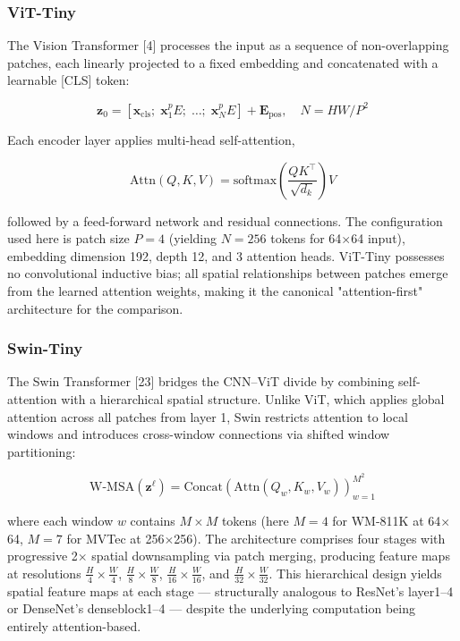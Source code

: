 \documentclass[11pt,a4paper]{article}
\begin{document}
\subsubsection{ViT-Tiny}

The Vision Transformer [4] processes the input as a sequence of non-overlapping patches, each linearly projected to a fixed embedding and concatenated with a learnable [CLS] token:

\begin{equation}
\mathbf{z}_0 = [\mathbf{x}_{\text{cls}};\; \mathbf{x}_1^p E;\; \ldots;\; \mathbf{x}_N^p E] + \mathbf{E}_{\text{pos}}, \quad N = HW / P^2
\tag{5}
\end{equation}

Each encoder layer applies multi-head self-attention,

\begin{equation}
\text{Attn}(Q, K, V) = \text{softmax}\!\left(\frac{QK^\top}{\sqrt{d_k}}\right)V
\tag{6}
\end{equation}

followed by a feed-forward network and residual connections. The configuration used here is patch size $P{=}4$ (yielding $N{=}256$ tokens for 64$\times$64 input), embedding dimension 192, depth 12, and 3 attention heads. ViT-Tiny possesses no convolutional inductive bias; all spatial relationships between patches emerge from the learned attention weights, making it the canonical "attention-first" architecture for the comparison.

\subsubsection{Swin-Tiny}

The Swin Transformer [23] bridges the CNN--ViT divide by combining self-attention with a hierarchical spatial structure. Unlike ViT, which applies global attention across all patches from layer 1, Swin restricts attention to local windows and introduces cross-window connections via shifted window partitioning:

\begin{equation}
\text{W-MSA}(\mathbf{z}^{\ell}) = \text{Concat}\left(\text{Attn}(Q_w, K_w, V_w)\right)_{w=1}^{M^2}
\tag{7}
\end{equation}

where each window $w$ contains $M{\times}M$ tokens (here $M{=}4$ for WM-811K at 64$\times$64, $M{=}7$ for MVTec at 256$\times$256). The architecture comprises four stages with progressive 2$\times$ spatial downsampling via patch merging, producing feature maps at resolutions $\frac{H}{4} {\times}\frac{W}{4}$, $\frac{H}{8}{\times}\frac{W}{8}$, $\frac{H}{16}{\times}\frac{W}{16}$, and $\frac{H}{32}{\times} \frac{W}{32}$. This hierarchical design yields spatial feature maps at each stage --- structurally analogous to ResNet's layer1--4 or DenseNet's denseblock1--4 --- despite the underlying computation being entirely attention-based.
\end{document}
